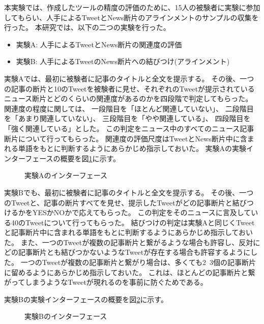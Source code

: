 \documentclass[12pt]{jarticle}
\begin{document}
本実験では、作成したツールの精度の評価のために、15人の被験者に実験に参加してもらい、人手によるTweetとNews断片のアラインメントのサンプルの収集を行った。
本研究では、以下の二つの実験を行った。
\begin{itemize}
  \item 実験A: 人手によるTweetとNews断片の関連度の評価
  \item 実験B: 人手によるTweetのNews断片への結びつけ(アラインメント)
\end{itemize}

実験Aでは、最初に被験者に記事のタイトルと全文を提示する。
その後、一つの記事の断片と10のTweetを被験者に見せ、それぞれのTweetが提示されているニュース断片とどのくらいの関連度があるのかを四段階で判定してもらった。
関連度の程度に関しては、
一段階目を「ほとんど関連していない」、
二段階目を「あまり関連していない」、
三段階目を「やや関連している」、
四段階目を「強く関連している」とした。
この判定をニュース中のすべてのニュース記事断片について行ってもらった。
関連度の評価尺度はTweetとNews断片中に含まれる単語をもとに判断するようにあらかじめ指示しておいた。
実験Aの実験インターフェースの概要を図\ref{annotation_by_human_A}に示す。

\begin{figure}[t]
  \begin{center}
  \end{center}
  \label{annotation_by_human_A}
  \caption{実験Aのインターフェース}
\end{figure}

実験Bでも、最初に被験者に記事のタイトルと全文を提示する。
その後、一つのTweetと、記事の断片すべてを見せ、提示したTweetがどの記事断片と結びつけるかをYESかNOかで応えてもらった。
この判定をそのニュースに言及している40のTweetについて行ってもらった。
結びつけの判定は実験Aと同じくTweetと記事断片中に含まれる単語をもとに判断するようにあらかじめ指示しておいた。
また、一つのTweetが複数の記事断片と繋がるような場合も許容し、反対にどの記事断片とも結びつかないようなTweetが存在する場合も許容するようにした。
一つのTweetが複数の記事断片と繋がり場合は、多くても2~3個の記事断片に留めるようにあらかじめ指示しておいた。
これは、ほとんどの記事断片と繋がってしまうようなTweetが現れるのを事前に防ぐためである。

実験Bの実験インターフェースの概要を図\ref{annotation_by_human_B}に示す。

\begin{figure}[t]
  \begin{center}
  \end{center}
  \label{annotation_by_human_B}
  \caption{実験Bのインターフェース}
\end{figure}
\end{document}
